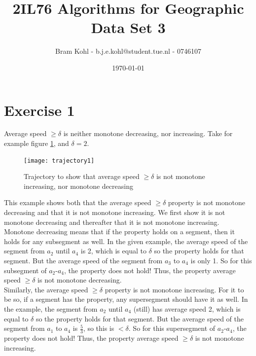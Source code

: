 \documentclass[a4paper,11pt]{article}
\title{
	2IL76 Algorithms for Geographic Data Set 3 \\
}
\author{
	Bram Kohl - b.j.e.kohl@student.tue.nl - 0746107
}
\date{\today}
\begin{document}
	\maketitle
	
\section*{Exercise 1}
Average speed $\geq \delta$ is neither monotone decreasing, nor increasing. Take for example figure \ref{fig:trajectory1}, and $\delta = 2$.

\begin{figure}[H]
	\centering
	\texttt{[image: trajectory1]}
	\caption{Trajectory to show that average speed $\geq \delta$ is not monotone increasing, nor monotone decreasing}
	\label{fig:trajectory1}
\end{figure}

This example shows both that the average speed $\geq \delta$ property is not monotone decreasing and that it is not monotone increasing. We first show it is not monotone decreasing and thereafter that it is not monotone increasing. \\

Monotone decreasing means that if the property holds on a segment, then it holds for any subsegment as well. In the given example, the average speed of the segment from $a_2$ until $a_4$ is 2, which is equal to $\delta$ so the property holds for that segment. But the average speed of the segment from $a_3$ to $a_4$ is only 1. So for this subsegment of $a_2$-$a_4$, the property does not hold! Thus, the property average speed $\geq \delta$ is not monotone decreasing.\\

Similarly, the average speed $\geq \delta$ property is not monotone increasing. For it to be so, if a segment has the property, any supersegment should have it as well. In the example, the segment from $a_2$ until $a_4$ (still) has average speed 2, which is equal to $\delta$ so the property holds for that segment. But the average speed of the segment from $a_1$ to $a_4$ is $\frac{5}{3}$, so this is $< \delta$. So for this supersegment of $a_2$-$a_4$, the property does not hold! Thus, the property average speed $\geq \delta$ is not monotone increasing.\\\\
\end{document}
